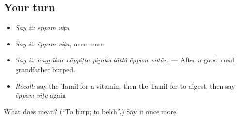 \subsection*{Your turn}
\begin{itemize}
\raggedright
  \item \emph{Say it:} \emph{ēppam viṭu}
  \item \emph{Say it:} \emph{ēppam viṭu}, once more
  \item \emph{Say it:} \emph{naṉṟākac cāppiṭṭa piṟaku tāttā ēppam viṭṭār.} — After a good meal grandfather burped.
  \item \emph{Recall:} say the Tamil for a vitamin, then the Tamil for to digest, then say \emph{ēppam viṭu} again
\end{itemize}

\begin{tcolorbox}[breakable,colback=teal!4,colframe=teal!35!black,title={Before you move on}]
What does   mean? (\textquotedblleft{}To burp; to belch\textquotedblright{}.) Say it once more.
\end{tcolorbox}
